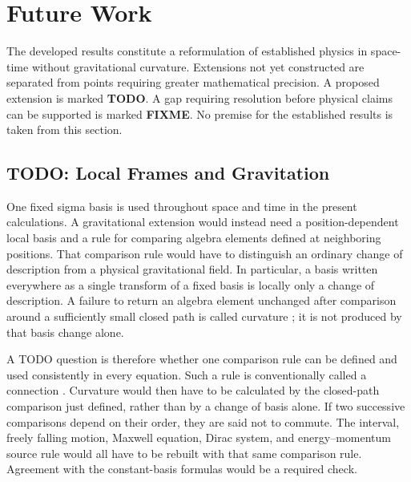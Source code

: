 \section{Future Work}\label{sec:future-work}
The developed results constitute a reformulation of established physics in
space-time without gravitational curvature. Extensions not yet constructed
are separated from points requiring
greater mathematical precision. A proposed extension is marked
\textbf{TODO}. A gap requiring resolution before physical claims can be
supported is marked \textbf{FIXME}. No premise for the established results is
taken from this section.

\subsection{TODO: Local Frames and Gravitation}
One fixed sigma basis is used throughout space and time in the present calculations.
A gravitational extension would instead need a position-dependent local
basis and a rule for comparing algebra elements defined at neighboring
positions.  That comparison rule would have to distinguish an ordinary
change of description from a physical gravitational field.  In particular,
a basis written everywhere as a single transform of a fixed basis is locally
only a change of description. A failure to return an algebra element
unchanged after comparison around a sufficiently small closed path is called
curvature \cite{doran2003}; it is not produced by that basis
change alone.

A TODO question is therefore whether one comparison rule can be defined and
used consistently in every equation. Such a rule is conventionally called a
connection \cite{doran2003}. Curvature would then have to be calculated by
the closed-path comparison just defined, rather than by a change of basis
alone. If two successive comparisons depend on their
order, they are said not to commute. The interval, freely falling motion,
Maxwell equation, Dirac system, and energy--momentum source rule would all
have to be rebuilt with that same comparison rule. Agreement with the
constant-basis formulas would be a required check.

